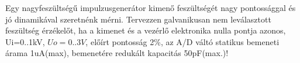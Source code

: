 \begin{example}

Egy nagyfeszültségű impulzusgenerátor kimenő feszültségét nagy pontossággal és jó dinamikával szeretnénk mérni. Tervezzen galvanikusan nem leválasztott feszültség érzékelőt, ha a kimenet és a vezérlő elektronika nulla pontja azonos, Ui=0..1kV, $Uo=0..3V$, előírt pontosság 2\%, az A/D váltó statikus bemeneti árama 1uA(max), bemenetére redukált kapacitás 50pF(max.)!

\tcbline
\vspace{1mm}

\solution

\end{example}